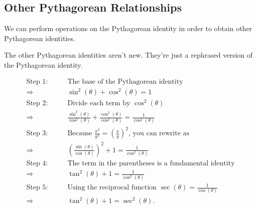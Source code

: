 
\subsection{Other Pythagorean Relationships}
\label{sub_sec:other_pythagorean_relationships}

We can perform operations on the Pythagorean identity in order to obtain other
Pythagorean identities.
\begin{note}
	\label{not:pythagorean_identities}

	The other Pythagorean identities aren't new. They're just a rephrased version
	of the Pythagorean identity.
\end{note}

\begin{align*}
	\textrm{Step 1:}\qquad & \textrm{The base of the Pythagorean identity}                                                                      \\
	\Rightarrow\qquad      & \sin^{2}(\theta) + \cos^{2}(\theta) = 1                                                                            \\
	\textrm{Step 2:}\qquad & \textrm{Divide each term by $\cos^{2}(\theta)$}                                                                    \\
	\Rightarrow\qquad      & \frac{\sin^{2}(\theta)}{\cos^{2}(\theta)} + \frac{\cos^{2}(\theta)}{\cos^{2}(\theta)} = \frac{1}{\cos^{2}(\theta)} \\
	\textrm{Step 3:}\qquad & \textrm{Because $\frac{x^{2}}{y^{2}} = \left(\frac{x}{y}\right)^{2}$, you can rewrite as}                          \\
	\Rightarrow\qquad      & \left(\frac{\sin(\theta)}{\cos(\theta)}\right)^{2} + 1 = \frac{1}{\cos^{2}(\theta)}                                \\
	\textrm{Step 4:}\qquad & \textrm{The term in the parentheses is a fundamental identity}                                                     \\
	\Rightarrow\qquad      & \tan^{2}(\theta) + 1 = \frac{1}{\cos^{2}(\theta)}                                                                  \\
	\textrm{Step 5:}\qquad & \textrm{Using the reciprocal function $\sec(\theta) = \frac{1}{\cos(\theta)}$}                                     \\
	\Rightarrow\qquad      & \tan^{2}(\theta) + 1 = \sec^{2}(\theta)
	.\end{align*}

